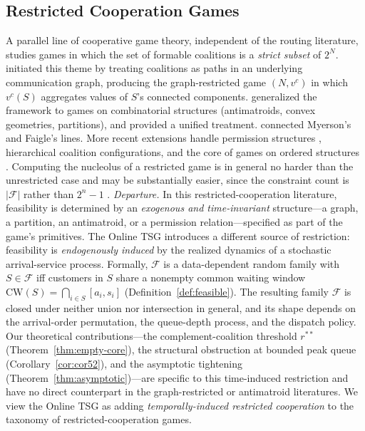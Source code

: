 \documentclass[11pt]{article}
\theoremstyle{plain}
\theoremstyle{definition}
\theoremstyle{remark}
\newcommand{\F}{\mathcal{F}}
\newcommand{\CW}{\mathrm{CW}}
\begin{document}
\subsection{Restricted Cooperation Games}

A parallel line of cooperative game theory, independent of the routing literature, studies games in which the set of formable coalitions is a \emph{strict subset} of $2^N$. \citet{myerson1977graphs} initiated this theme by treating coalitions as paths in an underlying communication graph, producing the graph-restricted game $(N, v^{c})$ in which $v^{c}(S)$ aggregates values of $S$'s connected components. \citet{faigle1989cores} generalized the framework to games on combinatorial structures (antimatroids, convex geometries, partitions), and \citet{bilbao2000} provided a unified treatment. \citet{algaba2001unified} connected Myerson's and Faigle's lines. More recent extensions handle permission structures \citep{gilles2010economic}, hierarchical coalition configurations, and the core of games on ordered structures \citep{grabisch2013core}. Computing the nucleolus of a restricted game is in general no harder than the unrestricted case and may be substantially easier, since the constraint count is $|\F|$ rather than $2^n-1$ \citep{schouten2019nucleolus}. \emph{Departure.} In this restricted-cooperation literature, feasibility is determined by an \emph{exogenous and time-invariant} structure---a graph, a partition, an antimatroid, or a permission relation---specified as part of the game's primitives. The Online TSG introduces a different source of restriction: feasibility is \emph{endogenously induced} by the realized dynamics of a stochastic arrival-service process. Formally, $\F$ is a data-dependent random family with $S\in\F$ iff customers in $S$ share a nonempty common waiting window $\CW(S)=\bigcap_{i\in S}[a_i,s_i]$ (Definition~\ref{def:feasible}). The resulting family $\F$ is closed under neither union nor intersection in general, and its shape depends on the arrival-order permutation, the queue-depth process, and the dispatch policy. Our theoretical contributions---the complement-coalition threshold $r^{\ast\ast}$ (Theorem~\ref{thm:empty-core}), the structural obstruction at bounded peak queue (Corollary~\ref{cor:cor52}), and the asymptotic tightening (Theorem~\ref{thm:asymptotic})---are specific to this time-induced restriction and have no direct counterpart in the graph-restricted or antimatroid literatures. We view the Online TSG as adding \emph{temporally-induced restricted cooperation} to the taxonomy of restricted-cooperation games.
\end{document}
